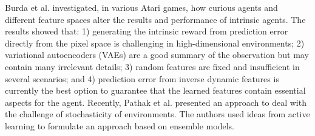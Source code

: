 

Burda et al. \cite{burda2018large} investigated, in various Atari games, how curious agents and different feature spaces alter the results and performance of intrinsic agents. The results showed that: 1) generating the intrinsic reward from prediction error directly from the pixel space is challenging in high-dimensional environments; 2) variational autoencoders (VAEs) are a good summary of the observation but may contain many irrelevant details; 3) random features are fixed and insufficient in several scenarios; and 4) prediction error from inverse dynamic features is currently the best option to guarantee that the learned features contain essential aspects for the agent. Recently, Pathak et al. \cite{pathak2019self} presented an approach to deal with the challenge of stochasticity of environments. The authors used ideas from active learning to formulate an approach based on ensemble models.


